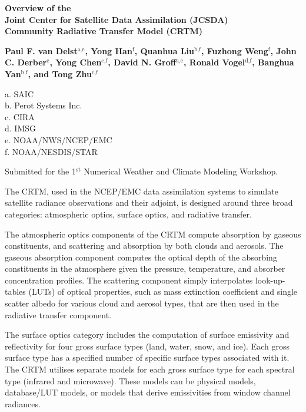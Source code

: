 \documentclass[10pt,letterpaper]{article}
\newcommand{\superscript}[1]{\ensuremath{^\textrm{#1}}}
\begin{document}
\thispagestyle{empty}

\begin{center}
  {\Large\bfseries Overview of the\\Joint Center for Satellite Data Assimilation (JCSDA)\vspace{0.1em}\\Community Radiative Transfer Model (CRTM)}\vspace{1.0em}
  
  {\bfseries Paul F. van Delst\superscript{a,e}, Yong Han\superscript{f}, Quanhua Liu\superscript{b,f}, Fuzhong Weng\superscript{f}, John C. Derber\superscript{e}, Yong Chen\superscript{c,f}, David N. Groff\superscript{a,e}, Ronald Vogel\superscript{d,f}, Banghua Yan\superscript{b,f}, and Tong Zhu\superscript{c,f}}\vspace{1.0em}
  
  a. SAIC\\
  b. Perot Systems Inc.\\
  c. CIRA\\
  d. IMSG\\
  e. NOAA/NWS/NCEP/EMC\\
  f. NOAA/NESDIS/STAR\vspace{1.0em}
  
  Submitted for the 1\superscript{st} Numerical Weather and Climate Modeling Workshop.
\end{center}

The CRTM, used in the NCEP/EMC data assimilation systems to simulate satellite radiance observations and their adjoint, is designed around three broad categories: atmospheric optics, surface optics, and radiative transfer.

The atmospheric optics components of the CRTM compute absorption by gaseous constituents, and scattering and absorption by both clouds and aerosols. The gaseous absorption component computes the optical depth of the absorbing constituents in the atmosphere given the pressure, temperature, and absorber concentration profiles. The scattering component simply interpolates look-up-tables (LUTs) of optical properties, such as mass extinction coefficient and single scatter albedo for various cloud and aerosol types, that are then used in the radiative transfer component.

The surface optics category includes the computation of surface emissivity and reflectivity for four gross surface types (land, water, snow, and ice). Each gross surface type has a specified number of specific surface types associated with it. The CRTM utilises separate models for each gross surface type for each spectral type (infrared and microwave). These models can be physical models, database/LUT models, or models that derive emissivities from window channel radiances.
\end{document}
